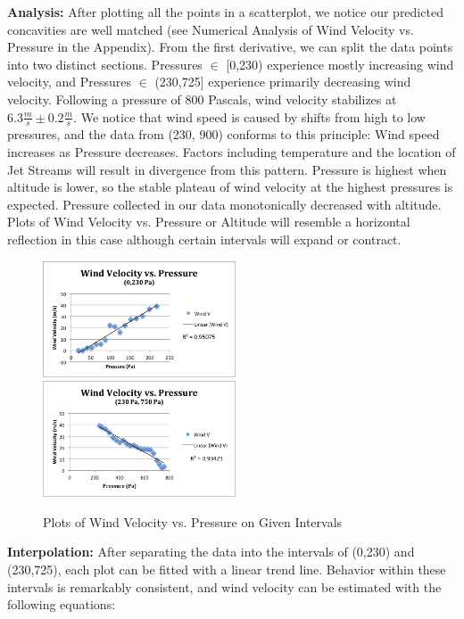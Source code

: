 \documentclass{article}
\begin{document}
\begin{flushleft}
\textbf{Analysis:} After plotting all the points in a scatterplot, we notice our predicted concavities are well matched (see Numerical Analysis of Wind Velocity vs. Pressure in the Appendix).  From the first derivative, we can split the data points into two distinct sections.  Pressures $\in$ [0,230) experience mostly increasing wind velocity, and Pressures $\in$ (230,725] experience primarily decreasing wind velocity.  Following a pressure of 800 Pascals, wind velocity stabilizes at $6.3\frac{m}{s} \pm 0.2\frac{m}{s}$.  We notice that wind speed is caused by shifts from high to low pressures, and the data from (230, 900) conforms to this principle: Wind speed increases as Pressure decreases.  Factors including temperature and the location of Jet Streams will result in divergence from this pattern.  Pressure is highest when altitude is lower, so the stable plateau of wind velocity at the highest pressures is expected.  Pressure collected in our data monotonically decreased with altitude.  Plots of Wind Velocity vs. Pressure or Altitude will resemble a horizontal reflection in this case although certain intervals will expand or contract.
\end{flushleft}

\begin{figure}[H]
\centering
\includegraphics[width=2.25in]{LPANDA.png}\hfill \includegraphics[width=2.25in]{RPANDA.png}
\caption{Plots of Wind Velocity vs. Pressure on Given Intervals}
\end{figure}

\begin{flushleft}
\textbf{Interpolation:} After separating the data into the intervals of (0,230) and (230,725), each plot can be fitted with a linear trend line.  Behavior within these intervals is remarkably consistent, and wind velocity can be estimated with the following equations:
\end{flushleft}
\end{document}

